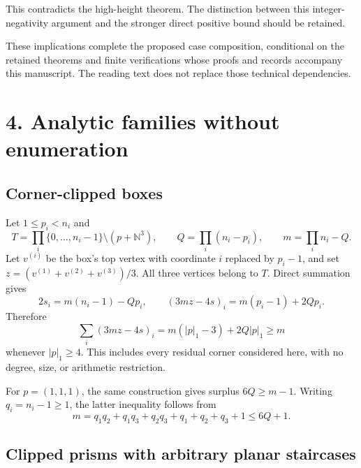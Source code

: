 \documentclass[
  11pt,
  a4paper,
]{article}
\let\oldsection\section
\renewcommand{\section}{\Needspace{7\baselineskip}\oldsection}
\begin{document}
This contradicts the high-height theorem. The distinction between this
integer-negativity argument and the stronger direct positive bound
should be retained.

These implications complete the proposed case composition, conditional
on the retained theorems and finite verifications whose proofs and
records accompany this manuscript. The reading text does not replace
those technical dependencies.

\hypertarget{analytic-families-without-enumeration}{%
\section{4. Analytic families without
enumeration}\label{analytic-families-without-enumeration}}

\hypertarget{corner-clipped-boxes}{%
\subsection{Corner-clipped boxes}\label{corner-clipped-boxes}}

Let \(1\le p_i<n_i\) and \[
T=\prod_i\{0,\ldots,n_i-1\}\setminus(p+\mathbb N^3),\qquad
Q=\prod_i(n_i-p_i),\qquad m=\prod_i n_i-Q.
\] Let \(v^{(i)}\) be the box's top vertex with coordinate \(i\)
replaced by \(p_i-1\), and set \(z=(v^{(1)}+v^{(2)}+v^{(3)})/3\). All
three vertices belong to \(T\). Direct summation gives \[
2s_i=m(n_i-1)-Qp_i,\qquad
(3mz-4s)_i=m(p_i-1)+2Qp_i.
\] Therefore \[
\sum_i(3mz-4s)_i=m(|p|_1-3)+2Q|p|_1\ge m
\] whenever \(|p|_1\ge4\). This includes every residual corner
considered here, with no degree, size, or arithmetic restriction.

For \(p=(1,1,1)\), the same construction gives surplus \(6Q\ge m-1\).
Writing \(q_i=n_i-1\ge1\), the latter inequality follows from \[
m=q_1q_2+q_1q_3+q_2q_3+q_1+q_2+q_3+1\le6Q+1.
\]

\hypertarget{clipped-prisms-with-arbitrary-planar-staircases}{%
\subsection{Clipped prisms with arbitrary planar
staircases}\label{clipped-prisms-with-arbitrary-planar-staircases}}
\end{document}
